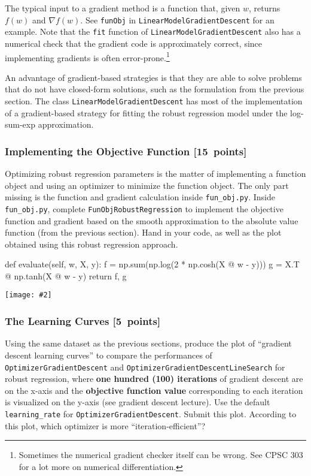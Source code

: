 \documentclass{article}
\newcommand{\blu}[1]{{\textcolor{blu}{#1}}}
\let\ask\blu
\newcommand\pts[1]{\textcolor{pointscolour}{[#1~points]}}
\newcommand{\centerfig}[2]{\begin{center}\texttt{[image: \#2]}\end{center}}
\begin{document}
The typical input to a gradient method is a function that, given $w$, returns $f(w)$ and $\nabla f(w)$. See \texttt{funObj} in \texttt{LinearModelGradientDescent} for an example. Note that the \texttt{fit} function of \texttt{LinearModelGradientDescent} also has a numerical check that the gradient code is approximately correct, since implementing gradients is often error-prone.\footnote{Sometimes the numerical gradient checker itself can be wrong. See CPSC 303 for a lot more on numerical differentiation.}

An advantage of gradient-based strategies is that they are able to solve
problems that do not have closed-form solutions, such as the formulation from the
previous section. The class \texttt{LinearModelGradientDescent} has most of the implementation
of a gradient-based strategy for fitting the robust regression model under the log-sum-exp approximation.

\subsubsection{Implementing the Objective Function \pts{15}}

Optimizing robust regression parameters is the matter of implementing a function object and using an optimizer to minimize the function object. The only part missing is the function and gradient calculation inside \texttt{fun\_obj.py}.
\ask{Inside \texttt{fun\_obj.py}, complete \texttt{FunObjRobustRegression} to implement the objective function and gradient based on the smooth
approximation to the absolute value function (from the previous section). Hand in your code, as well
as the plot obtained using this robust regression approach.}

\begin{python}
def evaluate(self, w, X, y):
    f = np.sum(np.log(2 * np.cosh(X @ w - y)))
    g = X.T @ np.tanh(X @ w - y)
    return f, g
\end{python}

\centerfig{0.7}{figs/robust_regression_gd}


\subsubsection{The Learning Curves \pts{5}}

Using the same dataset as the previous sections, produce the plot of ``gradient descent learning curves'' to compare the performances of \texttt{OptimizerGradientDescent} and \texttt{OptimizerGradientDescentLineSearch} for robust regression, where \textbf{one hundred (100) iterations} of gradient descent are on the x-axis and the \textbf{objective function value} corresponding to each iteration is visualized on the y-axis (see gradient descent lecture). Use the default \texttt{learning\_rate} for \texttt{OptimizerGradientDescent}. \ask{Submit this plot. According to this plot, which optimizer is more ``iteration-efficient''?}
\end{document}

